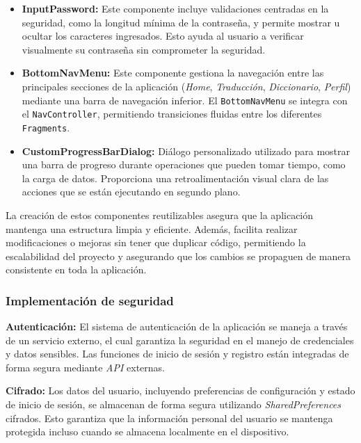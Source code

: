 \begin{itemize}
    \item \textbf{InputPassword:} Este componente incluye validaciones centradas en la seguridad, como la longitud mínima de la contraseña, y permite mostrar u ocultar los caracteres ingresados. Esto ayuda al usuario a verificar visualmente su contraseña sin comprometer la seguridad.

    \item \textbf{BottomNavMenu:} Este componente gestiona la navegación entre las principales secciones de la aplicación (\textit{Home}, \textit{Traducción}, \textit{Diccionario}, \textit{Perfil}) mediante una barra de navegación inferior. El \texttt{BottomNavMenu} se integra con el \texttt{NavController}, permitiendo transiciones fluidas entre los diferentes \texttt{Fragments}.

    \item \textbf{CustomProgressBarDialog:} Diálogo personalizado utilizado para mostrar una barra de progreso durante operaciones que pueden tomar tiempo, como la carga de datos. Proporciona una retroalimentación visual clara de las acciones que se están ejecutando en segundo plano.
\end{itemize}

La creación de estos componentes reutilizables asegura que la aplicación mantenga una estructura limpia y eficiente. Además, facilita realizar modificaciones o mejoras sin tener que duplicar código, permitiendo la escalabilidad del proyecto y asegurando que los cambios se propaguen de manera consistente en toda la aplicación.



\subsubsection{Implementación de seguridad}

\textbf{Autenticación:} El sistema de autenticación de la aplicación se maneja a través de un servicio externo, el cual garantiza la seguridad en el manejo de credenciales y datos sensibles. Las funciones de inicio de sesión y registro están integradas de forma segura mediante \textit{API} externas.

\textbf{Cifrado:} Los datos del usuario, incluyendo preferencias de configuración y estado de inicio de sesión, se almacenan de forma segura utilizando \textit{SharedPreferences} cifrados. Esto garantiza que la información personal del usuario se mantenga protegida incluso cuando se almacena localmente en el dispositivo.

